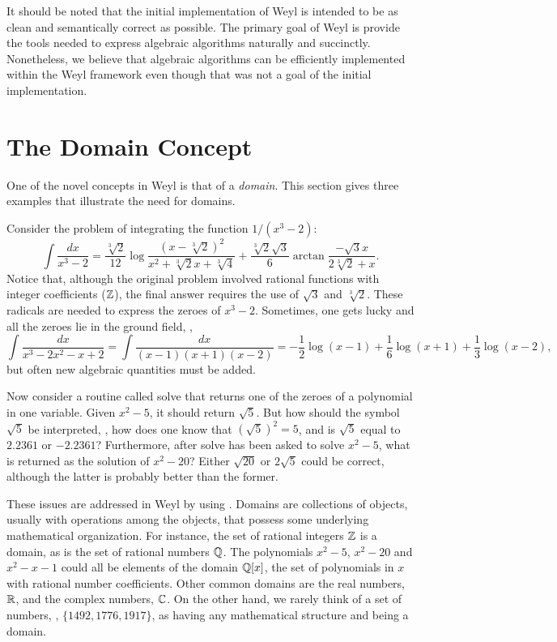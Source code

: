 It should be noted that the initial implementation of Weyl is intended
to be as clean and semantically correct as possible.  The primary goal
of Weyl is provide the tools needed to express algebraic algorithms
naturally and succinctly.  Nonetheless, we believe that algebraic
algorithms can be efficiently implemented within the Weyl framework
even though that was not a goal of the initial implementation.

\section{The Domain Concept}
\label{Domain:Concept:Sec}

One of the novel concepts in Weyl is that of a {\em domain\/}.  This
section gives three examples that illustrate the need for domains. 

Consider the problem of integrating the function $1/(x^3-2)$:
\[
\int \frac{dx}{x^3-2} = 
\frac{\sqrt[3]{2}}{12} \log\frac{(x - \sqrt[3]{2})^2}{x^2 +
\sqrt[3]{2}x + \sqrt[3]{4}} + \frac{\sqrt[3]{2} \sqrt{3}}{6} 
    \arctan\frac{- \sqrt{3} x}{2 \sqrt[3]{2} + x}.
\]
Notice that, although the original problem involved rational functions
with integer coefficients (${\Bbb Z}$), the final answer requires the use of
$\sqrt{3}$ and $\sqrt[3]{2}$.  These radicals are needed to express
the zeroes of $x^3-2$.  Sometimes, one gets lucky and all the zeroes
lie in the ground field, \eg,
\[
\int\frac{dx}{x^3 -2x^2 - x +2} = \int\frac{dx}{(x-1)(x+1)(x-2)}
 = -\frac{1}{2} \log (x-1) + \frac{1}{6}\log(x+1) + \frac{1}{3} \log(x-2),
\]
but often new algebraic quantities must be added.

Now consider a routine called {\sf solve} that returns one of the
zeroes of a polynomial in one variable.  Given $x^2-5$, it should
return $\sqrt{5}$.  But how should the symbol $\sqrt{5}$ be
interpreted, \ie, how does one know that $(\sqrt{5})^2 = 5$, and is
$\sqrt{5}$ equal to $2.2361$ or $-2.2361$?  Furthermore, after {\sf
solve} has been asked to solve $x^2-5$, what is returned as the
solution of  $x^2-20$?
Either $\sqrt{20}$ or $2 \sqrt{5}$ could be correct, although the
latter is probably better than the former.

These issues are addressed in Weyl by using .  Domains are
collections of objects, usually with operations among the objects, that
possess some underlying mathematical organization.  For instance, the
set of rational integers ${\Bbb Z}$ is a domain, as is the set of rational
numbers ${\Bbb Q}$.  The polynomials $x^2-5$, $x^2-20$ and $x^2-x-1$ could
all be elements of the domain ${\Bbb Q}[x]$, the set of polynomials in $x$
with rational number coefficients.  Other common domains are the real
numbers, ${\Bbb R}$, and the complex numbers, ${\Bbb C}$.  On the other hand, we
rarely think of a set of numbers, \eg, $\{ 1492, 1776, 1917\}$, as
having any mathematical structure and being a domain. 

